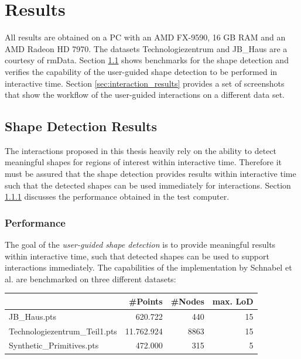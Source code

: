 \chapter{Results}
\label{chap:results}

All results are obtained on a PC with an AMD FX-9590, 16 GB RAM and an AMD Radeon HD 7970. The datasets Technologiezentrum and JB\_Haus are a courtesy of rmData\cite{rmdata}. Section \ref{sec:shape_detection_results} shows benchmarks for the shape detection and verifies the capability of the user-guided shape detection to be performed in interactive time. Section \ref{sec:interaction_results} provides a set of screenshots that show the workflow of the user-guided interactions on a different data set. 


\section{Shape Detection Results}
\label{sec:shape_detection_results}

The interactions proposed in this thesis heavily rely on the ability to detect meaningful shapes for regions of interest within interactive time. Therefore it must be assured that the shape detection provides results within interactive time such that the detected shapes can be used immediately for interactions. Section \ref{sec:shape_detection_performance} discusses the performance obtained in the test computer. 


\subsection{Performance}

\label{sec:shape_detection_performance}

The goal of the \textit{user-guided shape detection} is to provide meaningful results within interactive time, such that detected shapes can be used to support interactions immediately. The capabilities of the implementation by Schnabel et al. \cite{schnabel-2007-software} are benchmarked on three different datasets: 

\begin{center}
\begin{tabular}{ l | r | r | r }
																	& \textbf{\#Points}	& \textbf{\#Nodes}	& \textbf{max. LoD} \\
    \hline
  JB\_Haus.pts                    & 620.722           & 440             	& 15 \\
  Technologiezentrum\_Teil1.pts   & 11.762.924        & 8863             	& 15 \\
  Synthetic\_Primitives.pts     	& 472.000           & 315               & 5 \\
    
\end{tabular}
\end{center}

